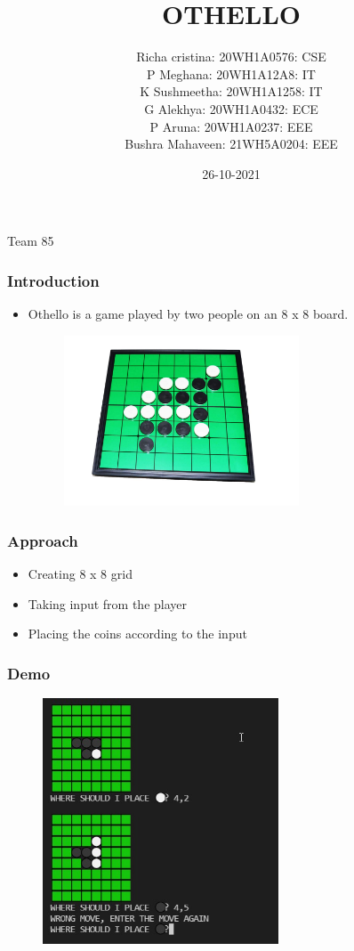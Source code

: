 \documentclass[14pt]{beamer}
\title{OTHELLO}
\date{26-10-2021}
\author[Bvrith]{Richa cristina: 20WH1A0576: CSE \\P Meghana: 20WH1A12A8: IT\\K Sushmeetha: 20WH1A1258: IT\\G Alekhya: 20WH1A0432: ECE\\P Aruna: 20WH1A0237: EEE\\Bushra Mahaveen: 21WH5A0204: EEE}
\begin{document}
    \begin{frame}
        \titlepage
          \begin{center}
	        Team 85
	      \end{center}
    \end{frame}
    \begin{frame}
	\frametitle{Introduction}
        \begin{itemize}
	    \item  Othello is a game played by two people on an 8 x 8 board.
		\vspace {0.2in}
               \begin{figure}
                   \includegraphics [width=7cm] {othellobg.jpg}
               \end{figure}
	\end{itemize}
    \end{frame}
    \begin{frame}
	\frametitle{Approach}
	\begin{itemize}
	    \item Creating 8 x 8 grid
           \item Taking input from the player
           \item Placing the coins according to the input
	\end{itemize}
    \end{frame}

    \begin{frame}
        \frametitle {Demo}
            \begin{figure}
                \includegraphics [width=7cm] {sampleoutput.jpeg}
            \end{figure}
     \end{frame}
\end{document}

